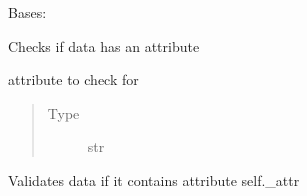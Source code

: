 \documentclass[letterpaper,10pt,english]{sphinxmanual}
\begin{document}
\begin{fulllineitems}
\label{\detokenize{dalio.validator:dalio.validator.base_val.HAS_ATTR}}
Bases: {\hyperref[\detokenize{dalio.validator:dalio.validator.validator.Validator}]{}}

Checks if data has an attribute

\begin{fulllineitems}
\label{\detokenize{dalio.validator:dalio.validator.base_val.HAS_ATTR._attr}}
attribute to check for
\begin{quote}\begin{description}
\item[{Type}] \leavevmode
str

\end{description}\end{quote}

\end{fulllineitems}


\begin{fulllineitems}
\label{\detokenize{dalio.validator:dalio.validator.base_val.HAS_ATTR.validate}}
Validates data if it contains attribute self.\_attr

\end{fulllineitems}


\end{fulllineitems}

\end{document}
